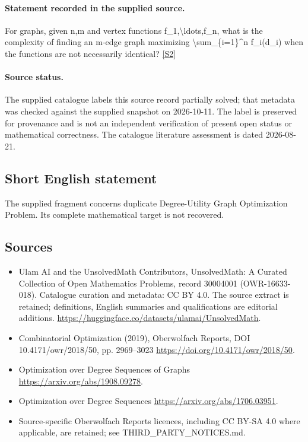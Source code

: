 \documentclass[11pt]{article}
\newcommand{\sref}[2]{\hyperlink{source:#1:#2}{[S#2]}}
\begin{document}
\paragraph{Statement recorded in the supplied source.}
For graphs, given n,m and vertex functions f\_1,\textbackslash{}ldots,f\_n, what is the complexity of finding an m-edge graph maximizing \textbackslash{}sum\_\{i=1\}\textasciicircum{}n f\_i(d\_i) when the functions are not necessarily identical? \sref{30004001}{2}
\paragraph{Source status.}
The supplied catalogue labels this source record partially solved; that metadata was checked against the supplied snapshot on 2026-10-11. The label is preserved for provenance and is not an independent verification of present open status or mathematical correctness. The catalogue literature assessment is dated 2026-08-21.
\subsection{Short English statement}
The supplied fragment concerns duplicate Degree-Utility Graph Optimization Problem. Its complete mathematical target is not recovered.
\subsection{Sources}
\begin{itemize}
\item[\hypertarget{source:30004001:1}{S1}] Ulam AI and the UnsolvedMath Contributors, UnsolvedMath: A Curated Collection of Open Mathematics Problems, record 30004001 (OWR-16633-018). Catalogue curation and metadata: CC BY 4.0. The source extract is retained; definitions, English summaries and qualifications are editorial additions.
\url{https://huggingface.co/datasets/ulamai/UnsolvedMath}.
\item[\hypertarget{source:30004001:2}{S2}] Combinatorial Optimization (2019), Oberwolfach Reports, DOI 10.4171/owr/2018/50, pp. 2969--3023
\url{https://doi.org/10.4171/owr/2018/50}.
\item[\hypertarget{source:30004001:3}{S3}] Optimization over Degree Sequences of Graphs
\url{https://arxiv.org/abs/1908.09278}.
\item[\hypertarget{source:30004001:4}{S4}] Optimization over Degree Sequences
\url{https://arxiv.org/abs/1706.03951}.
\item Source-specific Oberwolfach Reports licences, including CC BY-SA 4.0 where applicable, are retained; see THIRD\_PARTY\_NOTICES.md.
\end{itemize}
\end{document}
